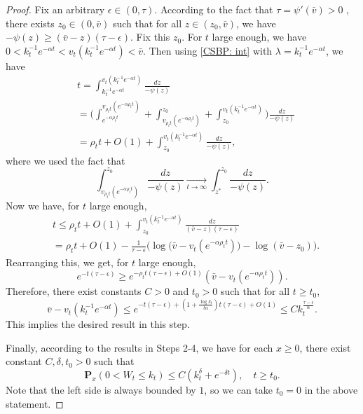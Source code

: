 \documentclass[12pt,a4paper]{amsart}
\theoremstyle{plain}
\theoremstyle{definition}
\numberwithin{equation}{section}
\begin{document}
\begin{proof}
    Fix an arbitrary $\epsilon \in (0,\tau)$.
    According to the fact that $\tau=\psi'(\bar v)>0$ , there exists $z_0 \in (0,\bar v)$ such that for all $z\in (z_0, \bar v)$, we have $-\psi(z)\geq (\bar v - z)(\tau- \epsilon)$.     Fix this $z_0$.
    For $t$ large enough, we have $0<k_t^{-1}e^{-\alpha t} < v_t(k_t^{-1}e^{-\alpha t})< \bar v$. Then  using \eqref{CSBP: int} with $\lambda=k_t^{-1} e^{-\alpha t}$, we have
\begin{equation}\begin{split}
    &t =\int^{v_t(k_t^{-1} e^{-\alpha t})}_{k_t^{-1} e^{-\alpha t}}\frac{dz}{-\psi(z)}
    \\&= \Big(\int^{v_{\rho_t t}(e^{-\alpha \rho_t t})}_{e^{-\alpha \rho_t t}}  + \int^{z_0}_{v_{\rho_t t}(e^{-\alpha \rho_t t})} +\int^{v_t(k_t^{-1}e^{-\alpha  t})}_{z_0}\Big)\frac{dz}{-\psi(z)}
     \\&= \rho_t t + O(1) +\int^{v_t(k_t^{-1}e^{-\alpha t})}_{z_0} \frac{dz}{-\psi(z)},
\end{split}\end{equation}
    where we used the fact that
\[
    \int_{v_{\rho_t t}(e^{-\alpha \rho_tt})}^{z_0} \frac{dz}{-\psi(z)} \xrightarrow[t\to \infty] {}\int_{z^*}^{z_0} \frac{dz}{-\psi(z)}.
\]
    Now we have, for $t$ large enough,
\begin{equation}\begin{split}
    &t\leq  \rho_t t + O(1)+ \int_{z_0}^{v_t(k_t^{-1}e^{-\alpha t})} \frac{dz}{(\bar v-z)(\tau - \epsilon)}
    \\&=  \rho_t t +O(1)- \frac{1}{\tau-\epsilon}\Big( \log \big(\bar v-v_t(e^{-\alpha \rho_t t})\big) - \log(\bar v-z_0)\Big).
\end{split}\end{equation}
    Rearranging this, we get, for $t$ large enough,
\[
    e^{-t(\tau - \epsilon)} \geq e^{-\rho_t t(\tau - \epsilon)+O(1)}(\bar v - v_t(e^{-\alpha \rho_t t})).
\]
    Therefore, there exist constants $C>0$ and $t_0>0$ such that for all $t\geq t_0$,
\[
    \bar v - v_t(k_t^{-1} e^{-\alpha t}) \leq e^{-t(\tau -\epsilon)+ (1+\frac{\log k_t}{t\alpha})t(\tau - \epsilon)+O(1)}
    \leq Ck_t^{\frac{\tau - \epsilon}{\alpha}}.
\]
    This implies the desired result in this step.

    Finally, according to the results in Steps 2-4, we have for each $x\geq 0$, there exist constant $C, \delta, t_0 > 0$ such that
\[
    \mathbf P_{x}(0< W_t\leq k_t) \leq C(k_t^{\delta}+e^{-\delta t}),\quad t\geq t_0.
\]
Note that the left side is always bounded by $1$, so we can take $t_0 =0$ in the above statement.
\end{proof}
\end{document}
